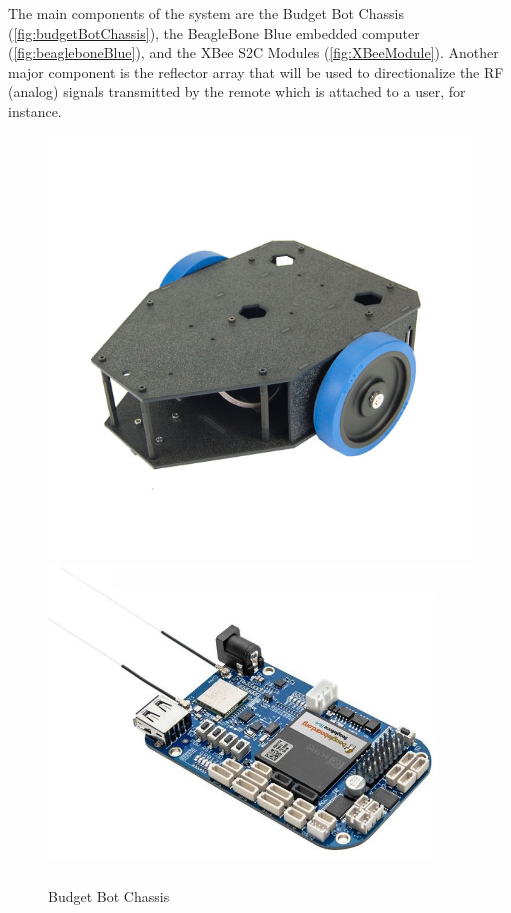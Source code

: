\documentclass[letterpaper,12pt]{article}   %
\begin{document}
\vspace*{12pt}
\noindent
The main components of the system are the Budget Bot Chassis (\autoref{fig:budgetBotChassis}), the BeagleBone Blue embedded computer (\autoref{fig:beagleboneBlue}), and the XBee S2C Modules (\autoref{fig:XBeeModule}). Another major component is the reflector array that
will be used to directionalize the RF (analog) signals transmitted by the remote which is attached to a user, for instance.

\begin{figure}
  \centering
  \begin{minipage}[t]{0.32\textwidth}
    \includegraphics[width=1\textwidth]{figs/img/budgetbot_chassis}
    \captionsetup{width=\textwidth}
    \caption{Budget Bot Chassis}
    \label{fig:budgetBotChassis}
  \end{minipage}%
  \begin{minipage}[t]{0.32\textwidth}
    \includegraphics[width=1\textwidth]{figs/img/beaglebone_blue}

\end{minipage}
\end{figure}
\end{document}
